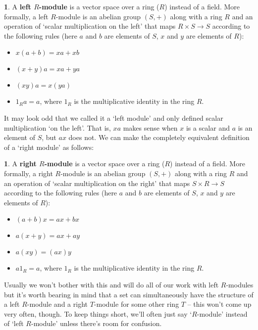 \documentclass[oneside,english]{amsbook}
\numberwithin{section}{chapter}
\theoremstyle{plain}
\theoremstyle{definition}
\newtheorem{defn}[thm]{\protect\definitionname}
\providecommand{\definitionname}{Definition}
\begin{document}
			\begin{defn}
				A \textbf{left $R$-module} is a vector space over a ring ($R$) instead of a field. More formally, a left $R$-module is an abelian group $(S, +)$ along with a ring $R$ and an operation of `scalar multiplication on the left' that maps $R\times S\to S$ according to the following rules (here $a$ and $b$ are elements of $S$, $x$ and $y$ are elements of $R$):
				\begin{itemize}
					\item $x(a + b) = xa + xb$ 
					\item $(x + y)a = xa + ya$
					\item $(xy)a = x(ya)$
					\item $1_Ra = a$, where $1_R$ is the multiplicative identity in the ring $R$.
				\end{itemize}
			\end{defn}
			
			It may look odd that we called it a `left module' and only defined scalar multiplication `on the left'. That is, $xa$ makes sense when $x$ is a scalar and $a$ is an element of $S$, but $ax$ does not. We can make the completely equivalent definition of a `right module' as follows:
			
			\begin{defn}
				A \textbf{right $R$-module} is a vector space over a ring ($R$) instead of a field. More formally, a right $R$-module is an abelian group $(S, +)$ along with a ring $R$ and an operation of `scalar multiplication on the right' that maps $S\times R\to S$ according to the following rules (here $a$ and $b$ are elements of $S$, $x$ and $y$ are elements of $R$):
				\begin{itemize}
					\item $(a + b)x = ax + bx$ 
					\item $a(x + y) = ax + ay$
					\item $a(xy) = (ax)y$
					\item $a1_R = a$, where $1_R$ is the multiplicative identity in the ring $R$.
				\end{itemize}
			\end{defn}
	
			Usually we won't bother with this and will do all of our work with left $R$-modules but it's worth bearing in mind that a set can simultaneously have the structure of a left $R$-module and a right $T$-module for some other ring $T$ -- this won't come up very often, though. To keep things short, we'll often just say `$R$-module' instead of `left $R$-module' unless there's room for confusion.
			
\end{document}
